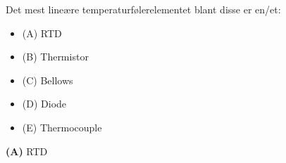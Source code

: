 

Det mest lineære temperaturfølerelementet blant disse er en/et:

\begin{itemize}
\item{(A)} RTD
\vskip 5pt 
\item{(B)} Thermistor
\vskip 5pt 
\item{(C)} Bellows
\vskip 5pt 
\item{(D)} Diode
\vskip 5pt 
\item{(E)} Thermocouple
\end{itemize}







{\bf (A)} RTD
 









